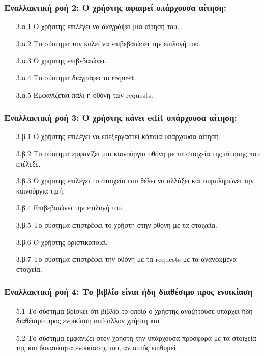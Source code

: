 \documentclass[12pt,a4paper]{article}
\begin{document}
\subsubsection*{Εναλλακτική ροή 2: Ο χρήστης αφαιρεί υπάρχουσα αίτηση:}
\begin{enumerate}
    \item[3.α.1] Ο χρήστης επιλέγει να διαγράψει μια αίτηση του.
    \item[3.α.2] Το σύστημα τον καλεί να επιβεβαιώσει την επιλογή του. 
    \item[3.α.3] Ο χρήστης επιβεβαιώνει.
    \item[3.α.4] Το σύστημα διαγράφει το request.
    \item[3.α.5] Εμφανίζεται πάλι η οθόνη των requests.
\end{enumerate}

\subsubsection*{Εναλλακτική ροή 3: Ο χρήστης κάνει edit υπάρχουσα αίτηση:}
\begin{enumerate}
    \item[3.β.1] Ο χρήστης επιλέγει να επεξεργαστεί κάποια υπάρχουσα αίτηση. 
    \item[3.β.2] Το σύστημα εμφανίζει μια καινούργια οθόνη με τα στοιχεία της αίτησης που επέλεξε. 
    \item[3.β.3] Ο χρήστης επιλέγει το στοιχείο που θέλει να αλλάξει και συμπληρώνει την καινούργια τιμή. 
    \item[3.β.4] Επιβεβαιώνει την επιλογή του.
    \item[3.β.5] Το σύστημα επιστρέφει το χρήστη στην οθόνη με τα στοιχεία. 
    \item[3.β.6] Ο χρήστης οριστικοποιεί.
    \item[3.β.7] Το σύστημα επιστρέφει την οθόνη με τα requests με τα ανανεωμένα στοιχεία.
\end{enumerate}

\subsubsection*{Εναλλακτική ροή 4: Το βιβλίο είναι ήδη διαθέσιμο προς ενοικίαση}
\begin{enumerate}
    \item[5.1] Το σύστημα βρίσκει ότι βιβλίο το οποίο ο χρήστης αναζητούσε υπάρχει ήδη διαθέσιμο προς ενοικίαση από άλλον χρήστη και 
    \item[5.2] Το σύστημα εμφανίζει στον χρήστη την υπάρχουσα προσφορά με τα στοιχεία της και δυνατότητα ενοικίασης του, αν αυτός επιθυμεί.
\end{enumerate}
\end{document}
